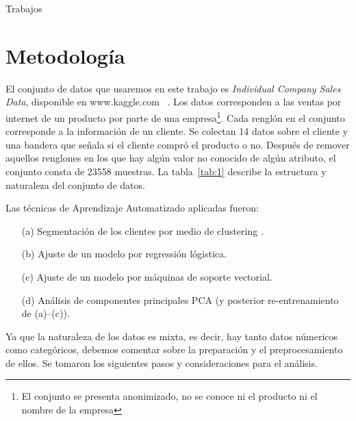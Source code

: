 \documentclass[letterpaper,11pt]{article}
\begin{document}
\begin{multicols}{2}
Trabajos
\section{Metodología}

El conjunto de datos que usaremos en este trabajo es \emph{Individual Company Sales Data}, disponible en www.kaggle.com~
\cite{kaggle}. Los datos corresponden a las ventas por internet de un producto por parte de una 
empresa\footnote{El conjunto se presenta anonimizado, no se conoce ni el producto ni el nombre de la empresa}. Cada
renglón en el conjunto corresponde a la información de un cliente.  Se colectan 14 datos sobre el cliente y una bandera
que señala si el cliente compró el producto o no. Después de remover aquellos renglones en los que hay algún valor
no conocido de algún atributo, el conjunto consta de 23558 muestras. La tabla~\ref{tab:1} describe la estructura y 
naturaleza del conjunto de datos.

Las técnicas de Aprendizaje Automatizado aplicadas fueron: 

\begin{itemize}
    \item[(a)] Segmentación de los clientes por medio de clustering \cite{segmen}.
    \item[(b)]  Ajuste de un modelo por regressión lógistica. 
    \item[(c)] Ajuste de un modelo por máquinas de soporte vectorial.
    \item[(d)] Análisis de componentes principales PCA \cite{book2} (y posterior re-entrenamiento de (a)--(c)). 
\end{itemize}


Ya que la naturaleza de los datos es mixta, es decir, hay tanto datos númericos como categóricos,
debemos comentar sobre la preparación y el preprocesamiento de ellos. Se tomaron los siguientes pasos y consideraciones para el análisis. 


\end{multicols}
\end{document}
